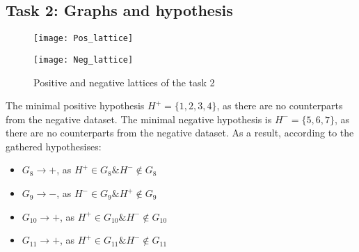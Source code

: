 \subsection{Task 2: Graphs and hypothesis}

\begin{figure}[h]
\centering
\begin{minipage}{0.49\textwidth}
\texttt{[image: Pos\_lattice]}
\end{minipage}
\hfill
\begin{minipage}{0.49\textwidth}
\texttt{[image: Neg\_lattice]}
\end{minipage}
\caption{Positive and negative lattices of the task 2}
\end{figure}

The minimal positive hypothesis $H^{+}=\{1,2,3,4\}$, as there are no counterparts from the negative dataset.
The minimal negative hypothesis is $H^{-}=\{5,6,7\}$, as there are no counterparts from the negative dataset.
As a result, according to the gathered hypothesises:

\begin{itemize}
\item $G_8 \rightarrow +$, as $H^{+} \in G_8 \& H^{-} \notin G_8$
\item $G_9 \rightarrow -$, as $H^{-} \in G_9 \& H^{+} \notin G_9$
\item $G_{10} \rightarrow +$, as $H^{+} \in G_{10} \& H^{-} \notin G_{10}$
\item $G_{11} \rightarrow +$, as $H^{+} \in G_{11} \& H^{-} \notin G_{11}$
\end{itemize}
